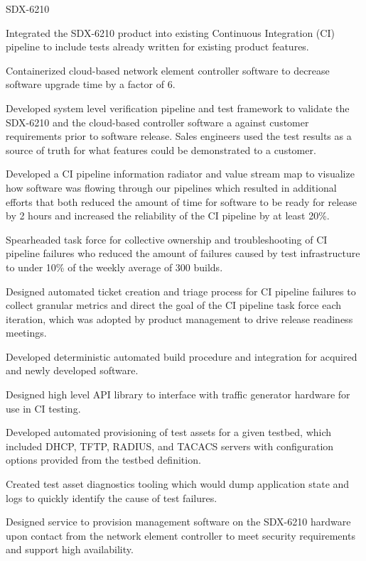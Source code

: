 \begin{cventries}
  \cventry
    {} {SDX-6210} {} {} {
      \begin{cvitems} %
        \item {Integrated the SDX-6210 product into existing Continuous Integration (CI) pipeline to include tests already written for existing product features.}
        \item {Containerized cloud-based network element controller software to decrease software upgrade time by a factor of 6.}
        \item {Developed system level verification pipeline and test framework to validate the SDX-6210 and the cloud-based controller software a against customer requirements prior to software release. Sales engineers used the test results as a source of truth for what features could be demonstrated to a customer.}
        \item {Developed a CI pipeline information radiator and value stream map to visualize how software was flowing through our pipelines which resulted in additional efforts that both reduced the amount of time for software to be ready for release by 2 hours and increased the reliability of the CI pipeline by at least 20\%.}
        \item {Spearheaded task force for collective ownership and troubleshooting of CI pipeline failures who reduced the amount of failures caused by test infrastructure to under 10\% of the weekly average of 300 builds.}
        \item {Designed automated ticket creation and triage process for CI pipeline failures to collect granular metrics and direct the goal of the CI pipeline task force each iteration, which was adopted by product management to drive release readiness meetings.}
        \item {Developed deterministic automated build procedure and integration for acquired and newly developed software.}
        \item {Designed high level API library to interface with traffic generator hardware for use in CI testing.}
        \item {Developed automated provisioning of test assets for a given testbed, which included DHCP, TFTP, RADIUS, and TACACS servers with configuration options provided from the testbed definition.}
        \item {Created test asset diagnostics tooling which would dump application state and logs to quickly identify the cause of test failures.}
        \item {Designed service to provision management software on the SDX-6210 hardware upon contact from the network element controller to meet security requirements and support high availability.}

\end{cvitems}}
\end{cventries}
